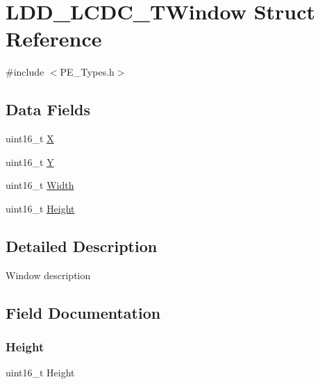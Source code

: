 \hypertarget{struct_l_d_d___l_c_d_c___t_window}{}\section{L\+D\+D\+\_\+\+L\+C\+D\+C\+\_\+\+T\+Window Struct Reference}
\label{struct_l_d_d___l_c_d_c___t_window}


{\ttfamily \#include $<$P\+E\+\_\+\+Types.\+h$>$}

\subsection*{Data Fields}
\begin{DoxyCompactItemize}
\item 
uint16\+\_\+t \hyperlink{struct_l_d_d___l_c_d_c___t_window_a60eb5e8306eb4f0eaa95ff5d16651e35}{X}
\item 
uint16\+\_\+t \hyperlink{struct_l_d_d___l_c_d_c___t_window_a50e294f91c22925f629a1a4a3507145c}{Y}
\item 
uint16\+\_\+t \hyperlink{struct_l_d_d___l_c_d_c___t_window_a9b3fe5d83fe7eb60cd86008934f65616}{Width}
\item 
uint16\+\_\+t \hyperlink{struct_l_d_d___l_c_d_c___t_window_a1a634e0d0d740b55406a6c2c194a7bfc}{Height}
\end{DoxyCompactItemize}


\subsection{Detailed Description}
Window description 

\subsection{Field Documentation}
\mbox{\label{struct_l_d_d___l_c_d_c___t_window_a1a634e0d0d740b55406a6c2c194a7bfc}} 
\subsubsection{\texorpdfstring{Height}{Height}}
{\footnotesize\ttfamily uint16\+\_\+t Height}

